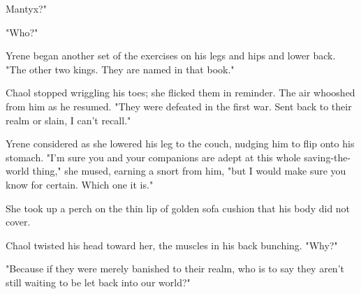 Mantyx?"

"Who?"

Yrene began another set of the exercises on his legs and hips and lower back. "The other two kings. They are named in that book."

Chaol stopped wriggling his toes; she flicked them in reminder. The air whooshed from him as he resumed. "They were defeated in the first war. Sent back to their realm or slain, I can't recall."

Yrene considered as she lowered his leg to the couch, nudging him to flip onto his stomach. "I'm sure you and your companions are adept at this whole saving-the-world thing," she mused, earning a snort from him, "but I would make sure you know for certain. Which one it is."

She took up a perch on the thin lip of golden sofa cushion that his body did not cover.

Chaol twisted his head toward her, the muscles in his back bunching. "Why?"

"Because if they were merely banished to their realm, who is to say they aren't still waiting to be let back into our world?"

